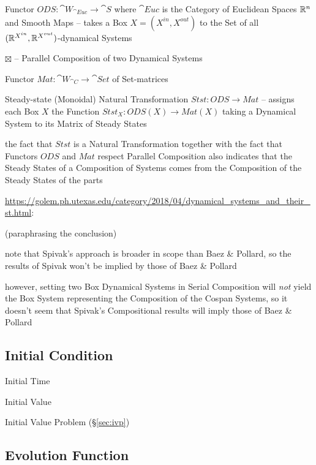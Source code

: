 Functor $ODS : \cat{W}_{\cat{Euc}} \rightarrow \cat{S}$ where $\cat{Euc}$ is
the Category of Euclidean Spaces $\mathbb{R}^n$ and Smooth Maps -- takes a Box $X =
(X^{in},X^{out})$ to the Set of all
$(\mathbb{R}^{X^{in}}, \mathbb{R}^{X^{out}})$-dynamical Systems

$\boxtimes$ -- Parallel Composition of two Dynamical Systems

Functor $Mat : \cat{W}_{\cat{C}} \rightarrow \cat{Set}$ of Set-matrices

Steady-state (Monoidal) Natural Transformation $Stst : ODS \rightarrow Mat$ --
assigns each Box $X$ the Function $Stst_X : ODS(X) \rightarrow Mat(X)$ taking a
Dynamical System to its Matrix of Steady States

the fact that $Stst$ is a Natural Transformation together with the fact that
Functors $ODS$ and $Mat$ respect Parallel Composition also indicates that the
Steady States of a Composition of Systems comes from the Composition of the
Steady States of the parts

\url{https://golem.ph.utexas.edu/category/2018/04/dynamical_systems_and_their_st.html}:

(paraphrasing the conclusion)

note that Spivak's approach is broader in scope than Baez \& Pollard, so the
results of Spivak won't be implied by those of Baez \& Pollard

however, setting two Box Dynamical Systems in Serial Composition will
\emph{not} yield the Box System representing the Composition of the Cospan
Systems, so it doesn't seem that Spivak's Compositional results will imply
those of Baez \& Pollard



\subsection{Initial Condition}\label{sec:initial_condition}

Initial Time

Initial Value

Initial Value Problem (\S\ref{sec:ivp})



\subsection{Evolution Function}\label{sec:evolution_function}

